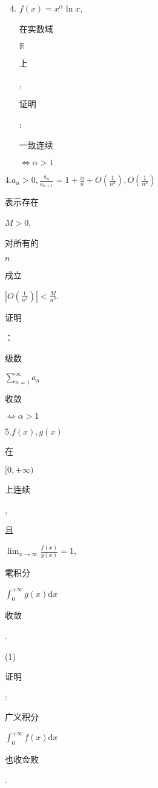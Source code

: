\documentclass[10pt]{article}
\begin{document}
\begin{enumerate}
  \setcounter{enumi}{3}
  \item $f(x)=x^{\alpha} \ln x$, \begin{CJK}{UTF8}{mj}在实数域\end{CJK} $\mathbb{R}$ \begin{CJK}{UTF8}{mj}上\end{CJK}, \begin{CJK}{UTF8}{mj}证明\end{CJK}: \begin{CJK}{UTF8}{mj}一致连续\end{CJK} $\Leftrightarrow \alpha>1$
\end{enumerate}
$4 . a_{n}>0, \frac{a_{n}}{a_{n+1}}=1+\frac{\alpha}{n}+O\left(\frac{1}{n^{2}}\right), O\left(\frac{1}{n^{2}}\right)$ \begin{CJK}{UTF8}{mj}表示存在\end{CJK} $M>0$, \begin{CJK}{UTF8}{mj}对所有的\end{CJK} $n$ \begin{CJK}{UTF8}{mj}戌立\end{CJK} $\left|O\left(\frac{1}{n^{2}}\right)\right|<\frac{M}{n^{2}}$.

\begin{CJK}{UTF8}{mj}证明\end{CJK}：\begin{CJK}{UTF8}{mj}级数\end{CJK} $\sum_{n=1}^{\infty} a_{n}$ \begin{CJK}{UTF8}{mj}收敛\end{CJK} $\Leftrightarrow \alpha>1$

$5 . f(x), g(x)$ \begin{CJK}{UTF8}{mj}在\end{CJK} $[0,+\infty)$ \begin{CJK}{UTF8}{mj}上连续\end{CJK}, \begin{CJK}{UTF8}{mj}且\end{CJK} $\lim _{x \rightarrow \infty} \frac{f(x)}{g(x)}=1$, \begin{CJK}{UTF8}{mj}雮积分\end{CJK} $\int_{0}^{+\infty} g(x) \mathrm{d} x$ \begin{CJK}{UTF8}{mj}收敛\end{CJK}.

(1) \begin{CJK}{UTF8}{mj}证明\end{CJK}: \begin{CJK}{UTF8}{mj}广义积分\end{CJK} $\int_{0}^{+\infty} f(x) \mathrm{d} x$ \begin{CJK}{UTF8}{mj}也收佥败\end{CJK}.
\end{document}
